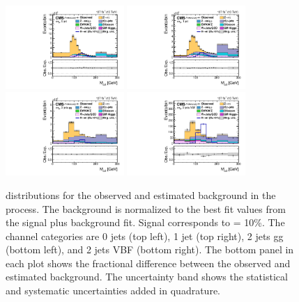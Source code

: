 \begin{figure}[htbp!]
  \centering
  \includegraphics[width=0.4\textwidth]{plots/chapter9/CB/emu/0jet.pdf}
  \includegraphics[width=0.4\textwidth]{plots/chapter9/CB/emu/1jet.pdf} \\
  \includegraphics[width=0.4\textwidth]{plots/chapter9/CB/emu/2jet_gg.pdf}
  \includegraphics[width=0.4\textwidth]{plots/chapter9/CB/emu/2jet_vbf.pdf} \\
  \caption{\mcol distributions for the observed and estimated background in the \emu process. The background is normalized to the best fit values from the signal plus background fit. Signal corresponds to \BHet = 10\%. The \emu channel categories are 0 jets (top left), 1 jet (top right), 2 jets gg (bottom left), and 2 jets VBF (bottom right). The bottom panel in each plot shows the fractional difference between the observed and estimated background. The uncertainty band shows the statistical and systematic uncertainties added in quadrature.}
  \label{fig:mcol_emu}
\end{figure}

